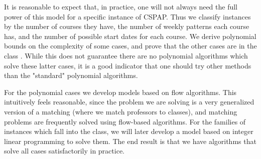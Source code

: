 It is reasonable to expect that, in practice, one will not always need the full power of this model for a specific instance of CSPAP. Thus we classify instances by the number of courses they have, the number of weekly patterns each course has, and the number of possible start dates for each course. We derive polynomial bounds on the complexity of some cases, and prove that the other cases are in the class \npc. While this does not guarantee there are no polynomial algorithms which solve these latter cases, it is a good indicator that one should try other methods than the "standard" polynomial algorithms.

For the polynomial cases we develop models based on flow algorithms. This intuitively feels reasonable, since the problem we are solving is a very generalized version of a matching (where we match professors to classes), and matching problems are frequently solved using flow-based algorithms\cite{clrs}. For the families of instances which fall into the \npc class, we will later develop a model based on integer linear programming to solve them. The end result is that we have algorithms that solve all cases satisfactorily in practice.
